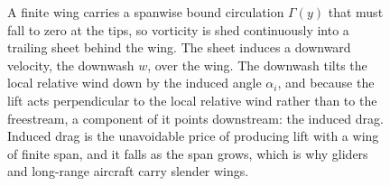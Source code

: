 \begin{figure}[htbp]
\begin{tikzpicture}[scale=1.0]
\end{tikzpicture}
\caption[Finite wing: trailing vorticity, downwash, and induced
drag]{A finite wing carries a spanwise bound circulation $\Gamma(y)$
that must fall to zero at the tips, so vorticity is shed continuously
into a trailing sheet behind the wing. The sheet induces a downward
velocity, the downwash $w$, over the wing. The downwash tilts the
local relative wind down by the induced angle $\alpha_i$, and because
the lift acts perpendicular to the local relative wind rather than to
the freestream, a component of it points downstream: the induced
drag. Induced drag is the unavoidable price of producing lift with a
wing of finite span, and it falls as the span grows, which is why
gliders and long-range aircraft carry slender wings.}
\label{fig:vol03ch11:finite-wing-planform}
\end{figure}
